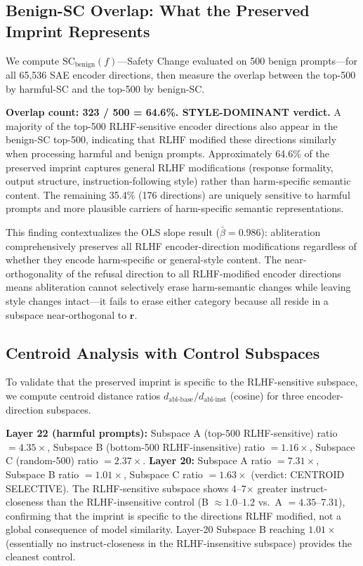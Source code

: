 \documentclass[11pt,letterpaper]{article}
\begin{document}
\subsection{Benign-SC Overlap: What the Preserved Imprint Represents}
\label{sec:overlap}

We compute $\text{SC}_{\text{benign}}(f)$---Safety Change evaluated on 500 benign prompts---for all
65,536 SAE encoder directions, then measure the overlap between the top-500 by harmful-SC and the
top-500 by benign-SC.

\textbf{Overlap count: 323 / 500 = 64.6\%. STYLE-DOMINANT verdict.} A majority of the top-500
RLHF-sensitive encoder directions also appear in the benign-SC top-500, indicating that RLHF modified
these directions similarly when processing harmful and benign prompts. Approximately 64.6\% of the
preserved imprint captures general RLHF modifications (response formality, output structure,
instruction-following style) rather than harm-specific semantic content. The remaining 35.4\% (176
directions) are uniquely sensitive to harmful prompts and more plausible carriers of harm-specific
semantic representations.

This finding contextualizes the OLS slope result ($\bar{\beta} = 0.986$): abliteration
comprehensively preserves all RLHF encoder-direction modifications regardless of whether they encode
harm-specific or general-style content. The near-orthogonality of the refusal direction to all
RLHF-modified encoder directions means abliteration cannot selectively erase harm-semantic changes
while leaving style changes intact---it fails to erase either category because all reside in a
subspace near-orthogonal to $\mathbf{r}$.

\subsection{Centroid Analysis with Control Subspaces}

To validate that the preserved imprint is specific to the RLHF-sensitive subspace, we compute
centroid distance ratios $d_{\text{abl-base}} / d_{\text{abl-inst}}$ (cosine) for three
encoder-direction subspaces.

\noindent\textbf{Layer 22 (harmful prompts):} Subspace A (top-500 RLHF-sensitive) ratio $= 4.35\times$,
Subspace B (bottom-500 RLHF-insensitive) ratio $= 1.16\times$, Subspace C (random-500) ratio
$= 2.37\times$. \textbf{Layer 20:} Subspace A ratio $= 7.31\times$, Subspace B ratio $= 1.01\times$,
Subspace C ratio $= 1.63\times$ (verdict: CENTROID SELECTIVE). The RLHF-sensitive subspace shows
4--7$\times$ greater instruct-closeness than the RLHF-insensitive control (B $\approx 1.0$--$1.2$
vs.\ A $= 4.35$--$7.31$), confirming that the imprint is specific to the directions RLHF modified,
not a global consequence of model similarity. Layer-20 Subspace B reaching $1.01\times$ (essentially
no instruct-closeness in the RLHF-insensitive subspace) provides the cleanest control.
\end{document}
